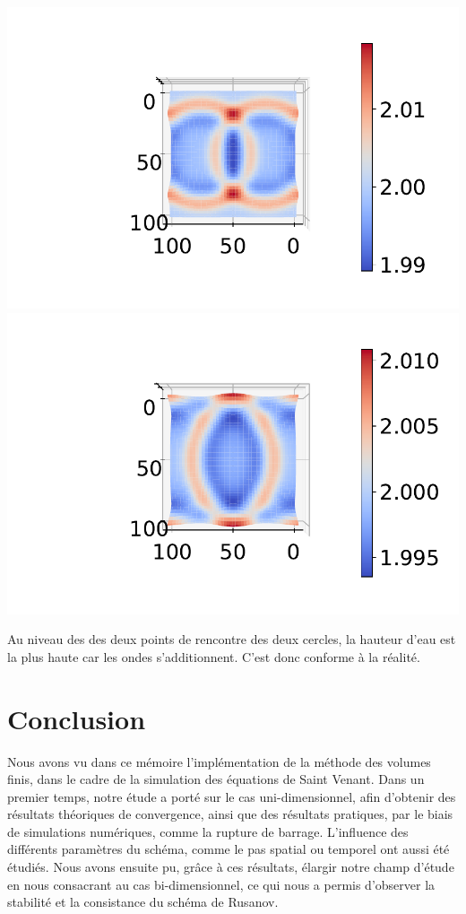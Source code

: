 \documentclass[
11pt, %
francais, %
singlespacing, %
headsepline, %
f%
]{MastersDoctoralThesis} %
\theoremstyle{definition}
\begin{document}
\begin{center}
\includegraphics[scale = 0.6]{gouttes2D2}
\includegraphics[scale = 0.6]{gouttes2D3} 
\end{center}

Au niveau des des deux points de rencontre des deux cercles, la hauteur d'eau est la plus haute car les ondes s'additionnent. C'est donc conforme à la réalité.


\section{Conclusion}

Nous avons vu dans ce mémoire l'implémentation de la méthode des volumes finis, dans le cadre de la simulation des équations de Saint Venant. Dans un premier temps, notre étude a porté sur le cas uni-dimensionnel, afin d'obtenir des résultats théoriques de convergence, ainsi que des résultats pratiques, par le biais de simulations numériques, comme la rupture de barrage. L'influence des différents paramètres du schéma, comme le pas spatial ou temporel ont aussi été étudiés. Nous avons ensuite pu, grâce à ces résultats, élargir notre champ d'étude en nous consacrant au cas bi-dimensionnel, ce qui nous a permis d'observer la stabilité et la consistance du schéma de Rusanov.
\end{document}
